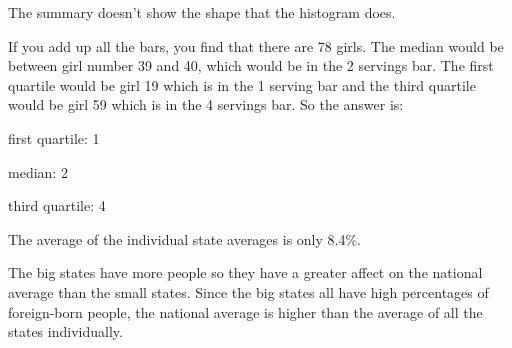 \documentclass[letterpaper, landscape]{exam}
\begin{document}
\begin{description}
        The summary doesn't show the shape that the histogram does.

      \item[30]
        If you add up all the bars, you find that there are 78 girls.  The
        median would be between girl number 39 and 40, which would be in the 2
        servings bar.  The first quartile would be girl 19 which is in the 1
        serving bar and the third quartile would be girl 59 which is in the 4
        servings bar.  So the answer is:

        \begin{itemize*}
          \item first quartile: 1
          \item median: 2
          \item third quartile: 4
        \end{itemize*}
        
      \pagebreak

      \item[32]

      \item[37]
        The average of the individual state averages is only 8.4\%.

        The big states have more people so they have a greater affect on the
        national average than the small states.  Since the big states all have
        high percentages of foreign-born people, the national average is higher
        than the average of all the states individually.


\end{description}
\end{document}
